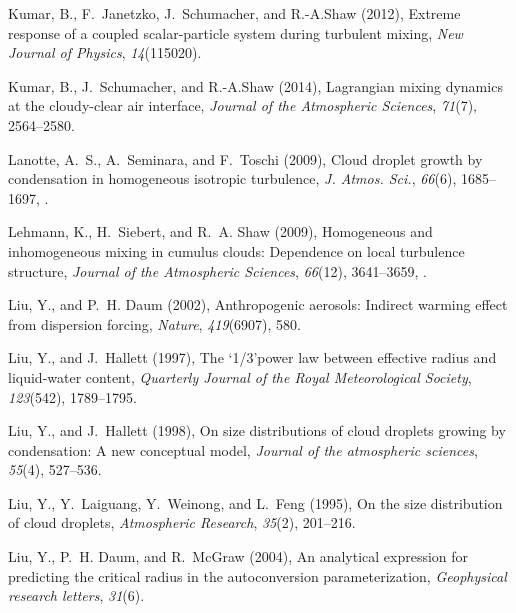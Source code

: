 \documentclass[draft,linenumbers]{agujournal}
\begin{document}
\begin{thebibliography}{60}
Kumar, B., F.~Janetzko, J.~Schumacher, and R.-A.Shaw (2012{}),
  Extreme response of a coupled scalar-particle system during turbulent mixing,
  \textit{New Journal of Physics}, \textit{14}(115020).

Kumar, B., J.~Schumacher, and R.-A.Shaw (2014), Lagrangian mixing dynamics at
  the cloudy-clear air interface, \textit{Journal of the Atmospheric Sciences},
  \textit{71}(7), 2564--2580.

Lanotte, A.~S., A.~Seminara, and F.~Toschi (2009), Cloud droplet growth by
  condensation in homogeneous isotropic turbulence, \textit{J. Atmos. Sci.},
  \textit{66}(6), 1685--1697, .

Lehmann, K., H.~Siebert, and R.~A. Shaw (2009{}), Homogeneous and
  inhomogeneous mixing in cumulus clouds: Dependence on local turbulence
  structure, \textit{Journal of the Atmospheric Sciences}, \textit{66}(12),
  3641--3659, .

Liu, Y., and P.~H. Daum (2002), Anthropogenic aerosols: Indirect warming effect
  from dispersion forcing, \textit{Nature}, \textit{419}(6907), 580.

Liu, Y., and J.~Hallett (1997), The ‘1/3’power law between effective radius
  and liquid-water content, \textit{Quarterly Journal of the Royal
  Meteorological Society}, \textit{123}(542), 1789--1795.

Liu, Y., and J.~Hallett (1998), On size distributions of cloud droplets growing
  by condensation: A new conceptual model, \textit{Journal of the atmospheric
  sciences}, \textit{55}(4), 527--536.

Liu, Y., Y.~Laiguang, Y.~Weinong, and L.~Feng (1995), On the size distribution
  of cloud droplets, \textit{Atmospheric Research}, \textit{35}(2), 201--216.

Liu, Y., P.~H. Daum, and R.~McGraw (2004), An analytical expression for
  predicting the critical radius in the autoconversion parameterization,
  \textit{Geophysical research letters}, \textit{31}(6).


\end{thebibliography}
\end{document}
